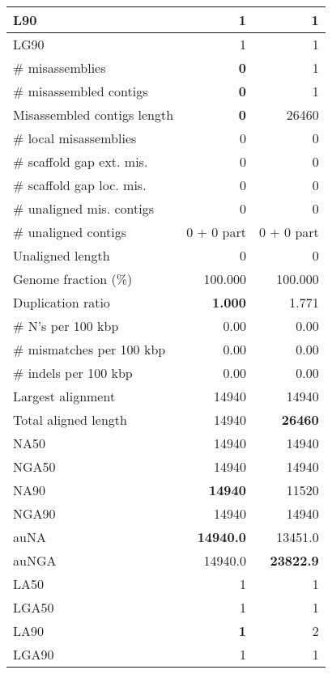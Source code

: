 \documentclass[12pt,a4paper]{article}
\begin{document}
\begin{table}[ht]
\begin{center}
\begin{tabular}{|l*{2}{|r}|}
L90 & 1 & 1 \\ \hline
LG90 & 1 & 1 \\ \hline
\# misassemblies & {\bf 0} & 1 \\ \hline
\# misassembled contigs & {\bf 0} & 1 \\ \hline
Misassembled contigs length & {\bf 0} & 26460 \\ \hline
\# local misassemblies & 0 & 0 \\ \hline
\# scaffold gap ext. mis. & 0 & 0 \\ \hline
\# scaffold gap loc. mis. & 0 & 0 \\ \hline
\# unaligned mis. contigs & 0 & 0 \\ \hline
\# unaligned contigs & 0 + 0 part & 0 + 0 part \\ \hline
Unaligned length & 0 & 0 \\ \hline
Genome fraction (\%) & 100.000 & 100.000 \\ \hline
Duplication ratio & {\bf 1.000} & 1.771 \\ \hline
\# N's per 100 kbp & 0.00 & 0.00 \\ \hline
\# mismatches per 100 kbp & 0.00 & 0.00 \\ \hline
\# indels per 100 kbp & 0.00 & 0.00 \\ \hline
Largest alignment & 14940 & 14940 \\ \hline
Total aligned length & 14940 & {\bf 26460} \\ \hline
NA50 & 14940 & 14940 \\ \hline
NGA50 & 14940 & 14940 \\ \hline
NA90 & {\bf 14940} & 11520 \\ \hline
NGA90 & 14940 & 14940 \\ \hline
auNA & {\bf 14940.0} & 13451.0 \\ \hline
auNGA & 14940.0 & {\bf 23822.9} \\ \hline
LA50 & 1 & 1 \\ \hline
LGA50 & 1 & 1 \\ \hline
LA90 & {\bf 1} & 2 \\ \hline
LGA90 & 1 & 1 \\ \hline
\end{tabular}
\end{center}
\end{table}
\end{document}
